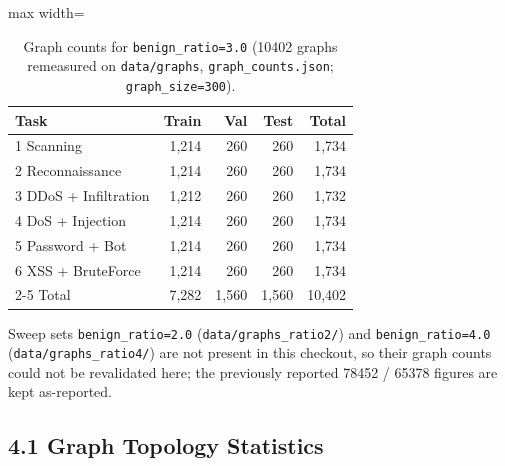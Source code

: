 \documentclass[11pt,a4paper]{article}
\begin{document}
\begin{table}[H]
\centering
\caption{Graph counts for \texttt{benign\_ratio=3.0} (\num{10402} graphs remeasured on \texttt{data/graphs}, \texttt{graph\_counts.json}; \texttt{graph\_size=300}).}
\label{tab:graph-counts}
\begin{adjustbox}{max width=\textwidth}
\begin{tabular}{lrrrr}
\toprule
Task & Train & Val & Test & Total \\
\midrule
1 Scanning & 1,214 & 260 & 260 & 1,734 \\
2 Reconnaissance & 1,214 & 260 & 260 & 1,734 \\
3 DDoS + Infiltration & 1,212 & 260 & 260 & 1,732 \\
4 DoS + Injection & 1,214 & 260 & 260 & 1,734 \\
5 Password + Bot & 1,214 & 260 & 260 & 1,734 \\
6 XSS + BruteForce & 1,214 & 260 & 260 & 1,734 \\
\cmidrule{2-5}
Total & 7,282 & 1,560 & 1,560 & 10,402 \\
\bottomrule
\end{tabular}
\end{adjustbox}
\end{table}

Sweep sets \texttt{benign\_ratio=2.0} (\texttt{data/graphs\_ratio2/}) and \texttt{benign\_ratio=4.0} (\texttt{data/graphs\_ratio4/}) are not present in this checkout, so their graph counts could not be revalidated here; the previously reported \num{78452} / \num{65378} figures are kept as-reported.

\subsection*{4.1 Graph Topology Statistics}
\end{document}
